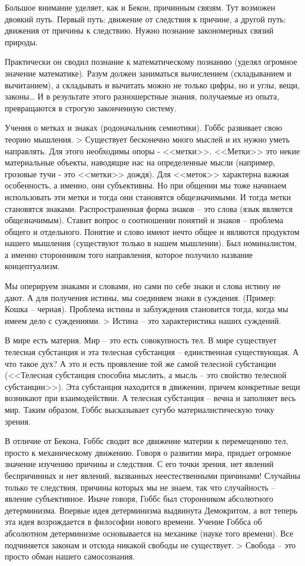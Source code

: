 Большое внимание уделяет, как и Бекон, причинным связям. Тут возможен двоякий путь. Первый путь: движение от следствия к причине, а другой путь: движения от причины к следствию. Нужно познание закономерных связий природы.

Практически он сводил познание к математическому познанию (уделял огромное значение математике). Разум должен заниматься вычислением (складыванием и вычитанием), а складывать и вычитать можно не только цифры, но и углы, вещи, законы… И в результате этого разношерстные знания, получаемые из опыта, превращаются в строгую законченную систему.

Учения о метках и знаках (родоначальник семиотики). Гоббс развивает свою теорию мышления. > Существует бесконечно много мыслей и их нужно уметь направлять. Для этого необходимы опоры - <<метки>>. <<Метки>> это некие материальные объекты, наводящие нас на определенные мысли (например, грозовые тучи - это <<метки>> дождя). Для <<меток>> характерна важная особенность, а именно, они субъективны. Но при общении мы тоже начинаем использовать эти метки и тогда они становятся общезначимыми. И тогда метки становятся знаками. Распространенная форма знаков – это слова (язык является общезначимым). Ставит вопрос о соотношении понятий и знаков – проблема общего и отдельного. Понятие и слово имеют нечто общее и являются продуктом нашего мышления (существуют только в нашем мышлении). Был номиналистом, а именно сторонником того направления, которое получило название концептуализм.

Мы оперируем знаками и словами, но сами по себе знаки и слова истину не дают. А для получения истины, мы соединяем знаки в суждения. (Пример: Кошка – черная). Проблема истины и заблуждения становится тогда, когда мы имеем дело с суждениями. > Истина – это характеристика наших суждений.

В мире есть материя. Мир – это есть совокупность тел. В мире существует телесная субстанция и эта телесная субстанция – единственная существующая. А что такое дух? А это и есть проявление той же самой телесной субстанции (<<Телесная субстанция способна мыслить, а мысль – это свойство телесной субстанции>>). Эта субстанция находится в движении, причем конкретные вещи возникают при взаимодействии. А телесная субстанция – вечна и заполняет весь мир. Таким образом, Гоббс высказывает сугубо материалистическую точку зрения.

В отличие от Бекона, Гоббс сводит все движение материи к перемещению тел, просто к механическому движению. Говоря о развитии мира, придает огромное значение изучению причины и следствия. С его точки зрения, нет явлений беспричинных и нет явлений, вызванных неестественными причинами! Случайны только те следствия, причины которых мы не знаем, так что случайность – явление субъективное. Иначе говоря, Гоббс был сторонником абсолютного детерминизма. Впервые идея детерминизма выдвинута Демокритом, а вот теперь эта идея возрождается в философии нового времени. Учение Гоббса об абсолютном детерминизме основывается на механике (науке того времени). Все подчиняется законам и отсюда никакой свободы не существует. > Свобода – это просто обман нашего самосознания.

